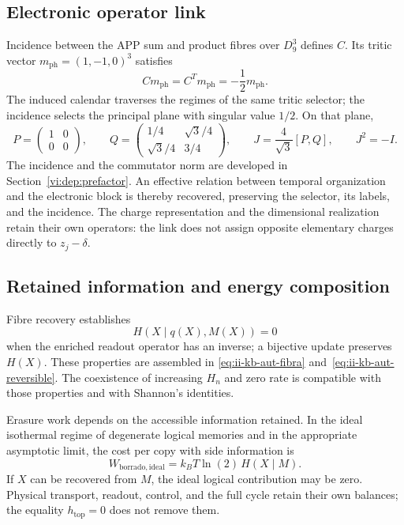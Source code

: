 \subsection{Electronic operator link}
\label{md:cron:electron}

Incidence between the APP sum and product fibres over $D_9^3$
defines $C$. Its tritic vector
$m_{\mathrm{ph}}=(1,-1,0)^3$ satisfies
\begin{equation}
 Cm_{\mathrm{ph}}=C^Tm_{\mathrm{ph}}
 =-\frac12m_{\mathrm{ph}}.
 \label{md:cron:modo-tritico}
\end{equation}
The induced calendar traverses the regimes of the same tritic selector;
the incidence selects the principal plane with singular value $1/2$.
On that plane,
\begin{equation}
 P=\begin{pmatrix}1&0\\0&0\end{pmatrix},\qquad
 Q=\begin{pmatrix}1/4&\sqrt3/4\\\sqrt3/4&3/4\end{pmatrix},
 \qquad J=\frac4{\sqrt3}[P,Q],\qquad J^2=-I.
 \label{md:cron:plano-electronico}
\end{equation}
The incidence and the commutator norm are developed in
Section~\ref{vi:dep:prefactor}. An effective relation between
temporal organization and the electronic block is thereby recovered, preserving the selector,
its labels, and the incidence. The charge representation and the dimensional
realization retain their own operators: the link does not assign
opposite elementary charges directly to $z_j-\delta$.

\subsection{Retained information and energy composition}
\label{md:cron:informacion-energia}

Fibre recovery establishes
\begin{equation}
 H(X\mid q(X),M(X))=0
 \label{md:cron:inversa-enriquecida}
\end{equation}
when the enriched readout operator has an inverse; a bijective update
preserves $H(X)$. These properties are assembled in
\eqref{eq:ii-kb-aut-fibra} and~\eqref{eq:ii-kb-aut-reversible}.
The coexistence of increasing $H_n$ and zero rate is compatible with those
properties and with Shannon's identities.

Erasure work depends on the accessible information retained.
In the ideal isothermal regime of degenerate logical memories and in the
appropriate asymptotic limit, the cost per copy with side information is
\begin{equation}
 W_{\mathrm{borrado,ideal}}
 =k_BT\ln(2)\,H(X\mid M).
 \label{md:cron:borrado}
\end{equation}
If $X$ can be recovered from $M$, the ideal logical contribution may be zero.
Physical transport, readout, control, and the full cycle retain
their own balances; the equality $h_{\mathrm{top}}=0$ does not remove them.


